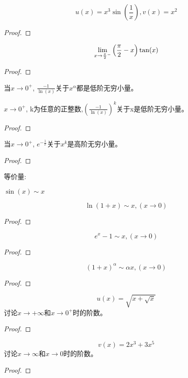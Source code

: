 \begin{proposition}
    \[ u(x) = x^3\sin \left( \frac{1}{x} \right), v(x) = x^2\]
\end{proposition}
\begin{proof}
    
\end{proof}
\begin{proposition}
    \[ \lim_{x \to \frac{\pi}{2}^- } \left( \frac{\pi}{2} - x \right)\tan(x)\]
\end{proposition}
\begin{proof}
    
\end{proof}
当$x \to 0^+$, $\frac{-1}{\ln(x)}$关于$x^\alpha$都是低阶无穷小量。
\begin{proposition}
    $x \to 0^+$, k为任意的正整数,$\left( \frac{-1}{\ln(x)}\right)^k$关于x是低阶无穷小量。
\end{proposition}
\begin{proof}
    
\end{proof}
\begin{proposition}
    当$x \to 0^+$, $e^{-\frac{1}{x}}$关于$x^k$是高阶无穷小量。
\end{proposition}
\begin{proof}
    
\end{proof}

等价量:

$\sin(x) \sim x$
\begin{proposition}
    \[ \ln(1+x) \sim x, (x \to 0) \] 
\end{proposition}
\begin{proof}
    
\end{proof}
\begin{proposition}
    \[ e^x - 1 \sim x, (x \to 0)\]
\end{proposition}
\begin{proof}
    
\end{proof}
\begin{proposition}
    \[ \left( 1 + x\right)^\alpha \sim \alpha x, (x \to 0)\]
\end{proposition}
\begin{proof}
    
\end{proof}
\begin{proposition}
    \[ u(x) = \sqrt{x + \sqrt{x}}\]
    讨论$x \to +\infty$和$x \to 0^+$时的阶数。
\end{proposition}
\begin{proof}
    
\end{proof}
\begin{proposition}
    \[ v(x) = 2x^3 + 3x^5\]
    讨论$x \to \infty$和$x \to 0$时的阶数。
\end{proposition}
\begin{proof}
    
\end{proof}

